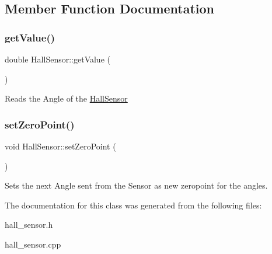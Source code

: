 \subsection{Member Function Documentation}
\mbox{\label{classHallSensor_a5eea1969e798bc786c5fa165aeb47c77}} 
\subsubsection{\texorpdfstring{get\+Value()}{getValue()}}
{\footnotesize\ttfamily double Hall\+Sensor\+::get\+Value (\begin{DoxyParamCaption}{ }\end{DoxyParamCaption})}

Reads the Angle of the \hyperlink{classHallSensor}{Hall\+Sensor} \mbox{\label{classHallSensor_ac97079734e670ba56401e6a8b37144e8}} 
\subsubsection{\texorpdfstring{set\+Zero\+Point()}{setZeroPoint()}}
{\footnotesize\ttfamily void Hall\+Sensor\+::set\+Zero\+Point (\begin{DoxyParamCaption}{ }\end{DoxyParamCaption})}

Sets the next Angle sent from the Sensor as new zeropoint for the angles. 

The documentation for this class was generated from the following files\+:\begin{DoxyCompactItemize}
\item 
hall\+\_\+sensor.\+h\item 
hall\+\_\+sensor.\+cpp\end{DoxyCompactItemize}
